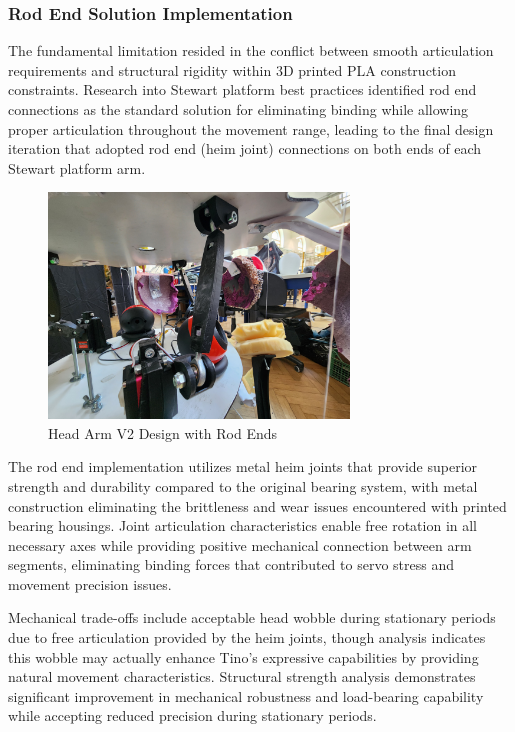 \subsubsection{Rod End Solution Implementation}

The fundamental limitation resided in the conflict between smooth articulation requirements and structural rigidity within 3D printed PLA construction constraints. Research into Stewart platform best practices identified rod end connections as the standard solution for eliminating binding while allowing proper articulation throughout the movement range, leading to the final design iteration that adopted rod end (heim joint) connections on both ends of each Stewart platform arm.

\begin{figure}[H]
    \centering
    \includegraphics[height=6cm]{Images/NewHeadDoubleJoint (4).jpg}
    \caption{Head Arm V2 Design with Rod Ends}
    \label{fig:head_arm_v2}
\end{figure}

The rod end implementation utilizes metal heim joints that provide superior strength and durability compared to the original bearing system, with metal construction eliminating the brittleness and wear issues encountered with printed bearing housings. Joint articulation characteristics enable free rotation in all necessary axes while providing positive mechanical connection between arm segments, eliminating binding forces that contributed to servo stress and movement precision issues.

Mechanical trade-offs include acceptable head wobble during stationary periods due to free articulation provided by the heim joints, though analysis indicates this wobble may actually enhance Tino's expressive capabilities by providing natural movement characteristics. Structural strength analysis demonstrates significant improvement in mechanical robustness and load-bearing capability while accepting reduced precision during stationary periods.

